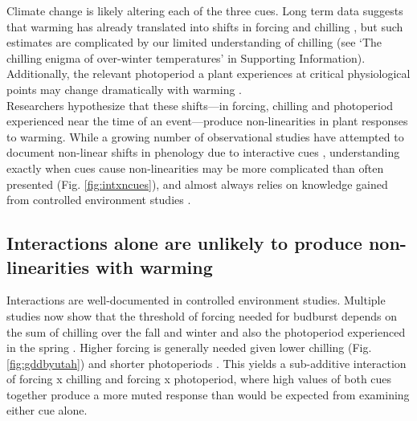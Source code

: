 \documentclass[11pt,letter]{article}
\begin{document}
Climate change is likely altering each of the three cues. Long term data suggests that warming has already translated into shifts in forcing and chilling \citep{fu2015,piao2017}, but such estimates are complicated by our limited understanding of chilling (see `The chilling enigma of over-winter temperatures' in Supporting Information). Additionally, the relevant photoperiod a plant experiences at critical physiological points may change dramatically with warming \citep{ospreephoto}. \\ %

Researchers hypothesize that these shifts---in forcing, chilling and photoperiod experienced near the time of an event---produce non-linearities in plant responses to warming. While a growing number of observational studies have attempted to document non-linear shifts in phenology due to interactive cues \citep{fu2015,gauzere2019}, understanding exactly when cues cause non-linearities may be more complicated than often presented (Fig. \ref{fig:intxncues}), and almost always relies on knowledge gained from controlled environment studies \citep[e.g.,][]{fu2015,richardson2018,gauzere2019}.

\subsection{Interactions alone are unlikely to produce non-linearities with warming}
Interactions are well-documented in controlled environment studies. Multiple studies now show that the threshold of forcing needed for budburst depends on the sum of chilling over the fall and winter and also the photoperiod experienced in the spring \citep[e.g.,][]{zohner2014,flynn2018}. Higher forcing is generally needed given lower chilling (Fig. \ref{fig:gddbyutah}) and shorter photoperiods \citep{Basler:2014aa,fu2019}. This yields a sub-additive interaction of forcing x chilling and forcing x photoperiod, where high values of both cues together produce a more muted response than would be expected from examining either cue alone.\\
\end{document}
